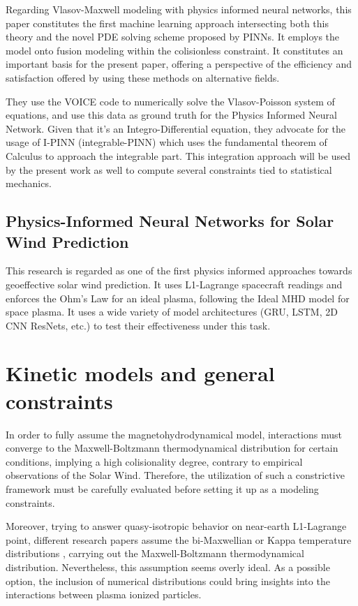 \documentclass[12pt]{article}
\begin{document}
Regarding Vlasov-Maxwell modeling with physics informed neural networks, this paper constitutes the first machine learning approach intersecting both this theory and the novel PDE solving scheme proposed by PINNs. \cite{kumar2023physicsinformedneuralnetworks} It employs the model onto fusion modeling within the colisionless constraint. It constitutes an important basis for the present paper, offering a perspective of the efficiency and satisfaction offered by using these methods on alternative fields.

They use the VOICE code to numerically solve the Vlasov-Poisson system of equations, and use this data as ground truth for the Physics Informed Neural Network. Given that it's an Integro-Differential equation, they advocate for the usage of I-PINN (integrable-PINN) \cite{} which uses the fundamental theorem of Calculus to approach the integrable part. This integration approach will be used by the present work as well to compute several constraints tied to statistical mechanics.

\subsection{Physics-Informed Neural Networks for Solar Wind Prediction}

This research \cite{johnson2022physics} is regarded as one of the first physics informed approaches towards geoeffective solar wind prediction. It uses L1-Lagrange spacecraft readings and enforces the Ohm's Law for an ideal plasma, following the Ideal MHD model for space plasma. It uses a wide variety of model architectures (GRU, LSTM, 2D CNN ResNets, etc.) to test their effectiveness under this task.


\section{Kinetic models and general constraints}
In order to fully assume the magnetohydrodynamical model, interactions must converge to the Maxwell-Boltzmann thermodynamical distribution for certain conditions, implying a high colisionality degree, contrary to empirical observations of the Solar Wind. Therefore, the utilization of such a constrictive framework must be carefully evaluated before setting it up as a modeling constraints.

Moreover, trying to answer quasy-isotropic behavior on near-earth L1-Lagrange point, different research papers assume the bi-Maxwellian or Kappa temperature distributions \cite{Stansby_2018, Nicolaou_2018, Zouganelis_2004}, carrying out the Maxwell-Boltzmann thermodynamical distribution. Nevertheless, this assumption seems overly ideal. As a possible option, the inclusion of numerical distributions could bring insights into the interactions between plasma ionized particles.
\end{document}
